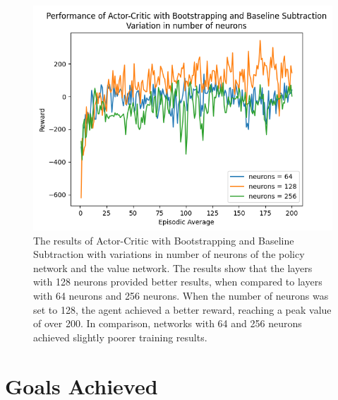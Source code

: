 \documentclass{article}
\begin{document}
\begin{figure}[h!]
\centering
\includegraphics[width=0.9\linewidth]{Report/images/12.Performance_of_Actor_Critic_BSandBS_Neurons.png}
\caption{\label{fig:ActorCriticBS2-different hidden layers}The results of Actor-Critic with Bootstrapping and Baseline Subtraction with variations in number of neurons of the policy network and the value network. The results show that the layers with 128 neurons provided better results, when compared to layers with 64 neurons and 256 neurons. When the number of neurons was set to 128, the agent achieved a better reward, reaching a peak value of over 200. In comparison, networks with 64 and 256 neurons achieved slightly poorer training results.}
\end{figure}

\section{Goals Achieved}
\end{document}
